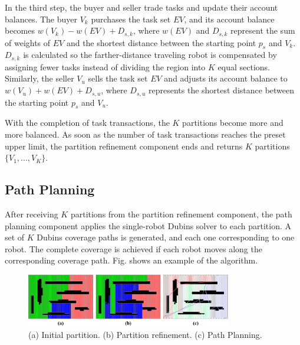 \documentclass[journal,article,submit,pdftex,moreauthors]{Definitions/mdpi}
\begin{document}
In the third step, the buyer and seller trade tasks and update their account balances. The buyer $V_k$ purchases the task set $EV$, and its account balance becomes $w(V_k)-w(EV)+D_{s,k}$, where $w(EV)$ and $D_{s,k}$ represent the sum of weights of $EV$ and the shortest distance between the starting point $p_s$ and $V_k$. $D_{s,k}$ is calculated so the farther-distance traveling robot is compensated by assigning fewer tasks instead of dividing the region into $K$ equal sections. Similarly, the seller $V_u$ sells the task set $EV$ and adjusts its account balance to $w(V_u)+w(EV)+D_{s,u}$, where $D_{s,u}$ represents the shortest distance between the starting point $p_s$ and $V_u$.

With the completion of task transactions, the $K$ partitions become more and more balanced. As soon as the number of task transactions reaches the preset upper limit, the partition refinement component ends and returns $K$ partitions $\{V_1,..., V_K\}$.


\subsection{Path Planning}

After receiving $K$ partitions from the partition refinement component, the path planning component applies the single-robot Dubins solver \cite{c56} to each partition. A set of $K$ Dubins coverage paths is generated, and each one corresponding to one robot. The complete coverage is achieved if each robot moves along the corresponding coverage path. Fig.\replaced{\ref{Fig_7}}{\ref{Eq.c7}} shows an example of the  algorithm.

\begin{figure}[htb] %
	\centering  %
    \vspace{0 cm} %
    \includegraphics[width=0.8\textwidth]{7.jpg}
    \caption{ (a) Initial partition. (b) Partition refinement. (c) Path Planning.}
    \vspace{-0.2 cm} %
   \label{Fig_7}
\end{figure}
\end{document}
